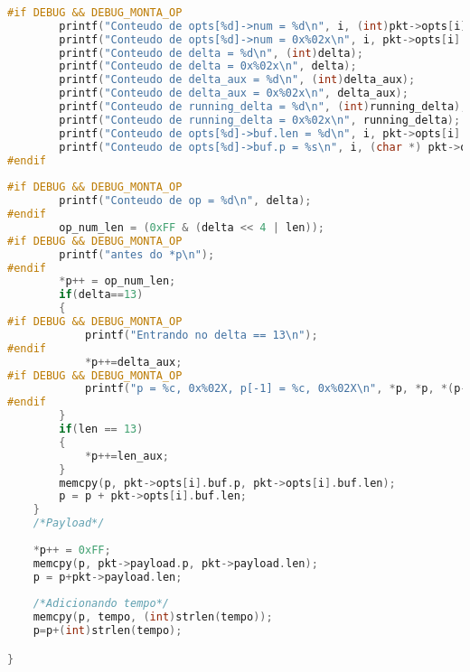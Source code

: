 \begin{lstlisting}[language=C++]
		
#if DEBUG && DEBUG_MONTA_OP
		printf("Conteudo de opts[%d]->num = %d\n", i, (int)pkt->opts[i].num);
		printf("Conteudo de opts[%d]->num = 0x%02x\n", i, pkt->opts[i].num);
		printf("Conteudo de delta = %d\n", (int)delta);
		printf("Conteudo de delta = 0x%02x\n", delta);
		printf("Conteudo de delta_aux = %d\n", (int)delta_aux);
		printf("Conteudo de delta_aux = 0x%02x\n", delta_aux);
		printf("Conteudo de running_delta = %d\n", (int)running_delta);
		printf("Conteudo de running_delta = 0x%02x\n", running_delta);
		printf("Conteudo de opts[%d]->buf.len = %d\n", i, pkt->opts[i].buf.len);
		printf("Conteudo de opts[%d]->buf.p = %s\n", i, (char *) pkt->opts[i].buf.p);
#endif
		
#if DEBUG && DEBUG_MONTA_OP
		printf("Conteudo de op = %d\n", delta);
#endif
		op_num_len = (0xFF & (delta << 4 | len));
#if DEBUG && DEBUG_MONTA_OP
		printf("antes do *p\n");
#endif
		*p++ = op_num_len;
		if(delta==13)
		{
#if DEBUG && DEBUG_MONTA_OP
			printf("Entrando no delta == 13\n");
#endif
			*p++=delta_aux;
#if DEBUG && DEBUG_MONTA_OP
			printf("p = %c, 0x%02X, p[-1] = %c, 0x%02X\n", *p, *p, *(p-1),*(p-1));
#endif
		}
		if(len == 13)
		{
			*p++=len_aux;
		}
		memcpy(p, pkt->opts[i].buf.p, pkt->opts[i].buf.len);
		p = p + pkt->opts[i].buf.len;
	}
	/*Payload*/
	
	*p++ = 0xFF;
	memcpy(p, pkt->payload.p, pkt->payload.len);
	p = p+pkt->payload.len;
	
	/*Adicionando tempo*/
	memcpy(p, tempo, (int)strlen(tempo));
	p=p+(int)strlen(tempo);

}


\end{lstlisting}
